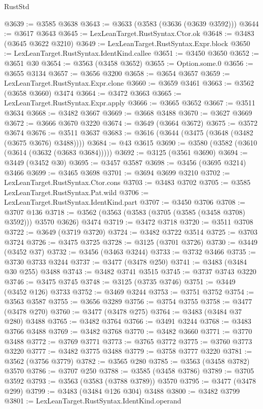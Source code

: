 \begin{lexlean}{RustStd}
\begin{coremodule}
@3639 := @3585 @3638
@3643 := @3633 (@3583 (@3636 (@3639 @3592)))
@3644 := @3617 @3643
@3645 := LexLeanTarget.RustSyntax.Ctor.ok
@3648 := @3483 (@3645 @3622 @3210)
@3649 := LexLeanTarget.RustSyntax.Expr.block
@3650 := LexLeanTarget.RustSyntax.IdentKind.callee
@3651 := @3450 @3650
@3652 := @3651 @30
@3654 := @3563 (@3458 @3652)
@3655 := Option.some.{0}
@3656 := @3655 @3134
@3657 := @3656 @3200
@3658 := @3654 @3657
@3659 := LexLeanTarget.RustSyntax.Expr.clone
@3660 := @3659 @3461
@3663 := @3562 (@3658 @3660) @3474
@3664 := @3472 @3663
@3665 := LexLeanTarget.RustSyntax.Expr.apply
@3666 := @3665 @3652
@3667 := @3511 @3634
@3668 := @3482 @3667
@3669 := @3668 @3488
@3670 := @3627 @3669
@3672 := @3666 @3670 @3220
@3674 := @3649 (@3664 @3672)
@3675 := @3572 @3674
@3676 := @3511 @3637
@3683 := @3616 (@3644 (@3475 (@3648 (@3482 (@3675 @3676) @3488))))
@3684 := @43 @3615
@3690 := @3580 (@3582 (@3610 (@3614 (@3632 (@3683 @3684)))))
@3692 := @3125 (@3561 @3690)
@3694 := @3449 (@3452 @30)
@3695 := @3457 @3587
@3698 := @3456 (@3695 @3214) @3466
@3699 := @3465 @3698
@3701 := @3694 @3699 @3210
@3702 := LexLeanTarget.RustSyntax.Ctor.cons
@3703 := @3483 @3702
@3705 := @3585 LexLeanTarget.RustSyntax.Pat.wild
@3706 := LexLeanTarget.RustSyntax.IdentKind.part
@3707 := @3450 @3706
@3708 := @3707 @136
@3718 := @3562 (@3563 (@3583 (@3705 (@3585 (@3458 @3708) @3592))) @3570 @3626) @3474
@3719 := @3472 @3718
@3720 := @3511 @3708
@3722 := @3649 (@3719 @3720)
@3724 := @3482 @3722 @3514
@3725 := @3703 @3724
@3726 := @3475 @3725
@3728 := @3125 (@3701 @3726)
@3730 := @3449 (@3452 @37)
@3732 := @3456 (@3463 @3244)
@3733 := @3732 @3466
@3735 := @3730 @3733 @3244
@3737 := @3477 (@3478 @250)
@3741 := @3483 (@3484 @30 @255) @3488
@3743 := @3482 @3741 @3515
@3745 := @3737 @3743 @3220
@3746 := @3475 @3745
@3748 := @3125 (@3735 @3746)
@3751 := @3449 (@3452 @126) @3733
@3752 := @3469 @3244
@3753 := @3751 @3752
@3754 := @3563 @3587
@3755 := @3656 @3289
@3756 := @3754 @3755
@3758 := @3477 (@3478 @270)
@3760 := @3477 (@3478 @275)
@3764 := @3483 (@3484 @37 @280) @3488
@3765 := @3482 @3764
@3766 := @3491 @3244
@3768 := @3483 @3766 @3488
@3769 := @3482 @3768
@3770 := @3482 @3660
@3771 := @3770 @3488
@3772 := @3769 @3771
@3773 := @3765 @3772
@3775 := @3760 @3773 @3220
@3777 := @3482 @3775 @3488
@3779 := @3758 @3777 @3220
@3781 := @3562 (@3756 @3779)
@3782 := @3565 @280
@3785 := @3563 (@3458 @3782) @3570
@3786 := @3707 @250
@3788 := @3585 (@3458 @3786)
@3789 := @3705 @3592
@3793 := @3563 (@3583 (@3788 @3789)) @3570
@3795 := @3477 (@3478 @299)
@3799 := @3483 (@3484 @126 @304) @3488
@3800 := @3482 @3799
@3801 := LexLeanTarget.RustSyntax.IdentKind.operand

\end{coremodule}
\end{lexlean}
